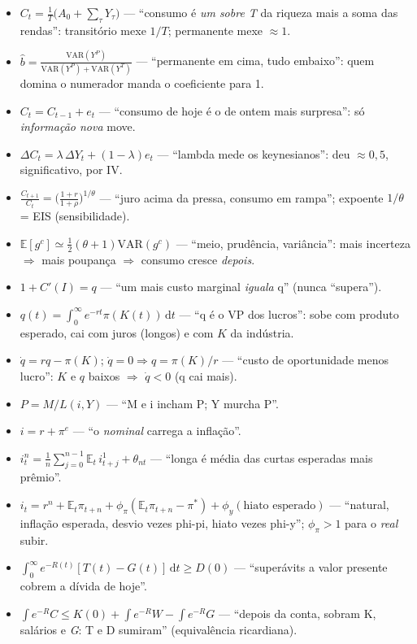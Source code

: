 \documentclass[12pt, a4paper]{article}
\newcommand{\E}{\mathbb{E}}
\newcommand{\dif}{\mathrm{d}}
\newcommand{\VAR}{\mathrm{VAR}}
\begin{document}
\begin{resultbox}[title={Fórmula $+$ leitura $+$ o sinal que importa}]
\begin{itemize}[leftmargin=1.4em, itemsep=0.4em]
\item $C_t = \frac{1}{T}\bigl(A_0 + \sum_\tau Y_\tau\bigr)$ ---
``consumo é \emph{um sobre T} da riqueza mais a soma das rendas'':
transitório mexe $1/T$; permanente mexe $\approx 1$.
\item $\hat b = \frac{\VAR(Y^P)}{\VAR(Y^P) + \VAR(Y^T)}$ ---
``permanente em cima, tudo embaixo'': quem domina o numerador manda o
coeficiente para 1.
\item $C_t = C_{t-1} + e_t$ --- ``consumo de hoje é o de ontem mais
surpresa'': só \emph{informação nova} move.
\item $\Delta C_t = \lambda\,\Delta Y_t + (1-\lambda)e_t$ ---
``lambda mede os keynesianos'': deu $\approx 0{,}5$, significativo, por IV.
\item $\frac{C_{t+1}}{C_t} = \bigl(\frac{1+r}{1+\rho}\bigr)^{1/\theta}$ ---
``juro acima da pressa, consumo em rampa''; expoente $1/\theta$ = EIS
(sensibilidade).
\item $\E[g^c] \simeq \frac{1}{2}(\theta+1)\VAR(g^c)$ ---
``meio, prudência, variância'': mais incerteza $\Rightarrow$ mais poupança
$\Rightarrow$ consumo cresce \emph{depois}.
\item $1 + C'(I) = q$ --- ``um mais custo marginal \emph{iguala} q'' (nunca
``supera'').
\item $q(t) = \int_0^\infty e^{-rt}\pi(K(t))\,\dif t$ ---
``q é o VP dos lucros'': sobe com produto esperado, cai com juros (longos) e
com $K$ da indústria.
\item $\dot q = rq - \pi(K)$; $\dot q = 0 \Rightarrow q = \pi(K)/r$ ---
``custo de oportunidade menos lucro'': $K$ e $q$ baixos $\Rightarrow$
$\dot q < 0$ (q cai mais).
\item $P = M/L(i,Y)$ --- ``M e i incham P; Y murcha P''.
\item $i = r + \pi^e$ --- ``o \emph{nominal} carrega a inflação''.
\item $i_t^n = \frac{1}{n}\sum_{j=0}^{n-1}\E_t\,i^1_{t+j} + \theta_{nt}$ ---
``longa é média das curtas esperadas mais prêmio''.
\item $i_t = r^n + \E_t\pi_{t+n} + \phi_\pi(\E_t\pi_{t+n} - \pi^*) +
\phi_y(\text{hiato esperado})$ --- ``natural, inflação esperada, desvio vezes
phi-pi, hiato vezes phi-y''; $\phi_\pi > 1$ para o \emph{real} subir.
\item $\int_0^\infty e^{-R(t)}[T(t)-G(t)]\,\dif t \geq D(0)$ ---
``superávits a valor presente cobrem a dívida de hoje''.
\item $\int e^{-R}C \leq K(0) + \int e^{-R}W - \int e^{-R}G$ ---
``depois da conta, sobram K, salários e \emph{G}: T e D sumiram''
(equivalência ricardiana).
\end{itemize}
\end{resultbox}
\end{document}
